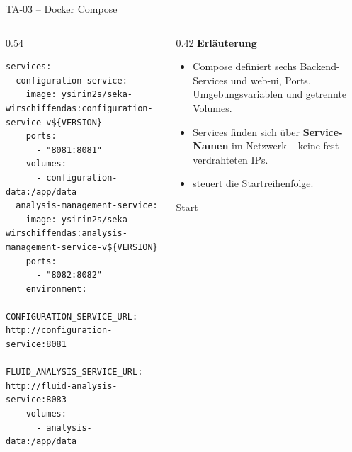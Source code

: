 \begin{frame}[fragile]{TA-03 -- Docker Compose}
  \begin{columns}[T,onlytextwidth]
    \begin{column}{0.54\textwidth}
      \begin{lstlisting}[style=yaml]
services:
  configuration-service:
    image: ysirin2s/seka-wirschiffendas:configuration-service-v${VERSION}
    ports:
      - "8081:8081"
    volumes:
      - configuration-data:/app/data
  analysis-management-service:
    image: ysirin2s/seka-wirschiffendas:analysis-management-service-v${VERSION}
    ports:
      - "8082:8082"
    environment:
      CONFIGURATION_SERVICE_URL: http://configuration-service:8081
      FLUID_ANALYSIS_SERVICE_URL: http://fluid-analysis-service:8083
    volumes:
      - analysis-data:/app/data
      \end{lstlisting}
    \end{column}
    \begin{column}{0.42\textwidth}
      \textbf{Erläuterung}
      \begin{itemize}
        \item Compose definiert sechs Backend-Services und web-ui, Ports, Umgebungsvariablen und getrennte Volumes.
        \item Services finden sich über \textbf{Service-Namen} im Netzwerk  -- keine fest verdrahteten IPs.
        \item {} steuert die Startreihenfolge.
      \end{itemize}
      \begin{block}{Start}
        \small {}
      \end{block}
    \end{column}
  \end{columns}
\end{frame}

